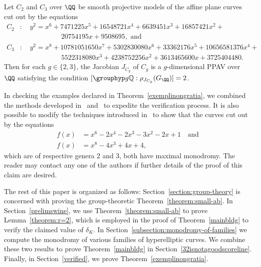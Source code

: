 \begin{theorem}\label{exemplinongratia}
Let $C_2$ and $C_3$ over $\QQ$ be smooth projective models of the affine plane curves cut out by the equations
\begin{align*}
C_2 & : \quad y^2 = x^6 + 7471225x^5 + 16548721x^4 + 6639451x^3 + 16857421x^2 + \\
& \qquad \qquad \qquad 20754195x +9508695, \text{ and} \\
C_3 & : \quad y^2 = x^8 + 10781051650x^7 + 5302830080x^6 + 33362176x^5 + 10656581376x^4  + \\
& \qquad \qquad \qquad 5522318080x^3 + 4238752256x^2  + 3613465600x  + 3725404480.
\end{align*}
Then for each $g \in \{2, 3\}$, the Jacobian $J_{C_g}$ of $C_g$ is a $g$-dimensional PPAV over $\QQ$ satisfying the condition $[\grouphyp g {\mathbb Q} : \rho_{J_{C_g}}(G_\QQ)] = 2$. \end{theorem}
\begin{remark}
In checking the examples declared in Theorem~\ref{exemplinongratia}, we combined the methods developed in~\cite{anni2017constructing} and~\cite{seaweed} to expedite the verification process. It is also possible to modify the techniques introduced in~\cite{seaweed} to show that the curves cut out by the equations
\begin{align}
f(x) & = x^6 - 2x^4 - 2x^3 - 3x^2 - 2x + 1 \quad \text{and} \\
f(x) & = x^8 -4x^3 + 4x + 4,
\end{align}
which are of respective genera $2$ and $3$, both have maximal monodromy. The reader may contact any one of the authors if further details of the proof of this claim are desired.
\end{remark}

The rest of this paper is organized as follows:
Section~\ref{section:group-theory} is concerned with proving the
group-theoretic Theorem~\ref{theorem:small-ab}.
In Section~\ref{prelimswine},
we use Theorem~\ref{theorem:small-ab} to prove
Lemma~\ref{theorem:r=2}, which
is employed in the proof of 
Theorem~\ref{mainbldg} to verify the claimed value
of $\delta_K$.
In Section~\ref{subsection:monodromy-of-families}
we compute the monodromy of various families of hyperelliptic curves.
We combine these two results to prove Theorem~\ref{mainbldg}
in Section~\ref{32isnotagoodscoreline}.
Finally, in Section~\ref{verified},
we prove Theorem~\ref{exemplinongratia}.
